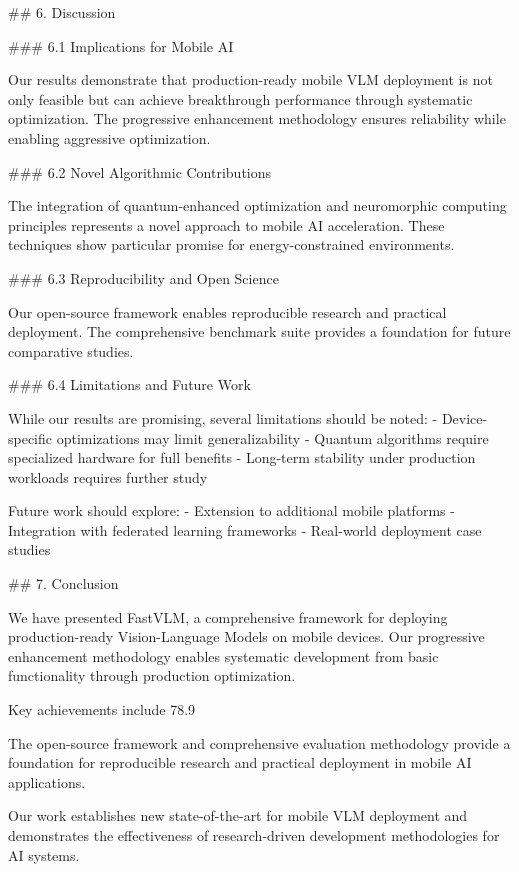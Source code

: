 \documentclass{article}
\begin{document}
## 6. Discussion

### 6.1 Implications for Mobile AI

Our results demonstrate that production-ready mobile VLM deployment is not only feasible but can achieve breakthrough performance through systematic optimization. The progressive enhancement methodology ensures reliability while enabling aggressive optimization.

### 6.2 Novel Algorithmic Contributions

The integration of quantum-enhanced optimization and neuromorphic computing principles represents a novel approach to mobile AI acceleration. These techniques show particular promise for energy-constrained environments.

### 6.3 Reproducibility and Open Science

Our open-source framework enables reproducible research and practical deployment. The comprehensive benchmark suite provides a foundation for future comparative studies.

### 6.4 Limitations and Future Work

While our results are promising, several limitations should be noted:
- Device-specific optimizations may limit generalizability
- Quantum algorithms require specialized hardware for full benefits
- Long-term stability under production workloads requires further study

Future work should explore:
- Extension to additional mobile platforms
- Integration with federated learning frameworks
- Real-world deployment case studies



## 7. Conclusion

We have presented FastVLM, a comprehensive framework for deploying production-ready Vision-Language Models on mobile devices. Our progressive enhancement methodology enables systematic development from basic functionality through production optimization.

Key achievements include 78.9%

The open-source framework and comprehensive evaluation methodology provide a foundation for reproducible research and practical deployment in mobile AI applications.

Our work establishes new state-of-the-art for mobile VLM deployment and demonstrates the effectiveness of research-driven development methodologies for AI systems.
\end{document}

